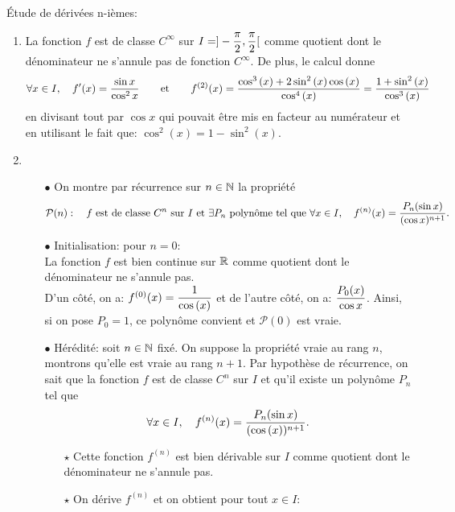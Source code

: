 \documentclass[a4paper, 11pt,reqno]{article}
\begin{document}
\begin{correction}   \;
	\'Etude de d\'eriv\'ees n-i\`emes:
	\begin{enumerate}
		\item La fonction $f$ est de classe $C^{\infty}$ sur $I=\rbrack -\ddp\frac{\pi}{2},\ddp\frac{\pi}{2}\lbrack$ comme quotient dont le d\'enominateur
		      ne s'annule pas de fonction $C^{\infty}$. De plus, le calcul donne
		      $$\forall x\in I,\quad f^{\prime}(x)=\ddp\frac{\sin{x}}{\cos^2{x}}\qquad \hbox{et}\qquad f^{(2)}(x)=
			      \ddp\frac{\cos^3{(x)} +2\sin^2{(x)}\cos{(x)}  }{\cos^4{(x)}}=\ddp\frac{1+\sin^2{(x)}}{\cos^3{(x)}}$$
		      en divisant tout par $\cos{x}$ qui pouvait \^etre mis en facteur au num\'erateur et en utilisant le fait que: $\cos^2{(x)}=1-\sin^2{(x)}$.
		\item
		      \begin{itemize}
			      \item[$\bullet$] On montre par r\'ecurrence sur $n\in\N$ la propri\'et\'e
			            $$\mathcal{P}(n):\quad f\ \hbox{est de classe}\ C^n\ \hbox{sur}\ I\ \hbox{et}\ \exists P_n\ \hbox{polyn\^ome tel que}\ \forall x\in I,\quad f^{(n)}(x)=\ddp\frac{P_n(\sin{x})}{(\cos{x})^{n+1}}.          $$
			      \item[$\bullet$] Initialisation: pour $n=0$:\\
			            \noindent La fonction $f$ est bien continue sur $\R$ comme quotient dont le d\'enominateur ne s'annule pas.\\
			            \noindent D'un c\^ot\'e, on a: $f^{(0)}(x)=\ddp\frac{1}{\cos{(x)}}$ et de l'autre c\^ot\'e, on a: $\ddp\frac{P_0(x)}{\cos{x}}$. Ainsi, si on pose $P_0=1$, ce polyn\^ome convient et $\mathcal{P}(0)$ est vraie.
			      \item[$\bullet$] H\'er\'edit\'e: soit $n\in\N$ fix\'e. On suppose la propri\'et\'e vraie au rang $n$, montrons qu'elle est vraie au rang $n+1$. Par hypoth\`ese de r\'ecurrence, on sait que la fonction $f$ est de classe $C^n$ sur $I$ et qu'il existe un polyn\^ome $P_n$ tel que
			            $$\forall x\in I,\quad f^{(n)}(x)=\ddp\frac{P_n(\sin{x})}{(\cos{(x)})^{n+1}}.$$
			            \begin{itemize}
				            \item[$\star$] Cette fonction $f^{(n)}$ est bien d\'erivable sur $I$ comme quotient dont le d\'enominateur ne s'annule pas.
				            \item[$\star$]
				                  On d\'erive $f^{(n)}$ et on obtient pour tout $x\in I$:
				                  $$\begin{array}{lll}

\end{array}$$
\end{itemize}
\end{itemize}
\end{enumerate}
\end{correction}
\end{document}
